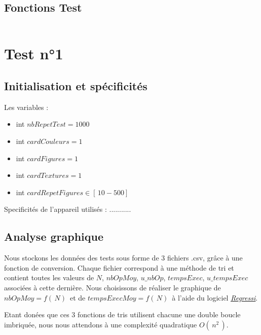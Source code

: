 \documentclass{report}
\begin{document}
\subsection{Fonctions Test}

\begin{lstlisting}[language=java, caption={\it Focntion marche aléatoire}, label=code2]
%insert code here
\end{lstlisting}



\newpage
\section{Test n°1}
\subsection{Initialisation et spécificités}
Les variables :
\begin{itemize}
	\item int $nbRepetTest = 1000$
	\item int $cardCouleurs = 1$
	\item int $cardFigures = 1$
	\item int $cardTextures = 1$
	\item int $cardRepetFigures \in [\, 10-500 ]\, $
\end{itemize}
Specificités de l'appareil utilisés : ...........



\subsection{Analyse graphique}

\qquad Nous stockons les données des tests sous forme de 3 fichiers .csv, grâce à une fonction de conversion. Chaque fichier correspond à une méthode de tri et contient toutes les valeurs de $N$, $nbOpMoy$, $u\_nbOp$, $tempsExec$, $u\_tempsExec$ associées à cette dernière. Nous choisissons de réaliser le graphique de $nbOpMoy=f(\,N)\,$ et de $tempsExecMoy=f(\,N)\,$ à l'aide du logiciel \href{https://regressi.fr/WordPress/}{\it \underline{Regressi}}.

\bigskip

\noindent Etant donées que ces 3 fonctions de tris utilisent chacune une double boucle imbriquée, nous nous attendons à une complexité quadratique $O(\,n^2\,)$.
\end{document}
